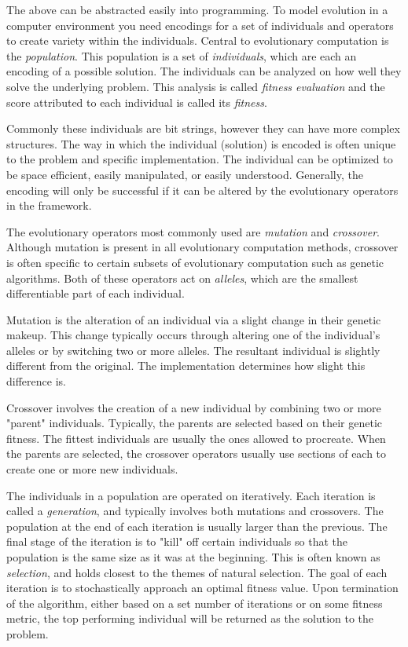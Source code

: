 \documentclass[10pt,letterpaper]{article}
\begin{document}
The above can be abstracted easily into programming. To model evolution in a computer environment you need encodings for a set of individuals and operators to create variety within the individuals. Central to evolutionary computation is the \textit{population}. This population is a set of \textit{individuals}, which are each an encoding of a possible solution. The individuals can be analyzed on how well they solve the underlying problem. This analysis is called \textit{fitness evaluation} and the score attributed to each individual is called its \textit{fitness}.

Commonly these individuals are bit strings, however they can have more complex structures. The way in which the individual (solution) is encoded is often unique to the problem and specific implementation. The individual can be optimized to be space efficient, easily manipulated, or easily understood. Generally, the encoding will only be successful if it can be altered by the evolutionary operators in the framework.

The evolutionary operators most commonly used are \textit{mutation} and \textit{crossover}. Although mutation is present in all evolutionary computation methods, crossover is often specific to certain subsets of evolutionary computation such as genetic algorithms. Both of these operators act on \textit{alleles}, which are the smallest differentiable part of each individual. %

Mutation is the alteration of an individual via a slight change in their genetic makeup. This change typically occurs through altering one of the individual's alleles or by switching two or more alleles. The resultant individual is slightly different from the original. The implementation determines how slight this difference is.

Crossover involves the creation of a new individual by combining two or more "parent" individuals. Typically, the parents are selected based on their genetic fitness. The fittest individuals are usually the ones allowed to procreate. When the parents are selected, the crossover operators usually use sections of each to create one or more new individuals. 

The individuals in a population are operated on iteratively. Each iteration is called a \textit{generation}, and typically involves both mutations and crossovers. The population at the end of each iteration is usually larger than the previous. The final stage of the iteration is to "kill" off certain individuals so that the population is the same size as it was at the beginning. This is often known as \textit{selection}, and holds closest to the themes of natural selection. The goal of each iteration is to stochastically approach an optimal fitness value. Upon termination of the algorithm, either based on a set number of iterations or on some fitness metric, the top performing individual will be returned as the solution to the problem.
\end{document}
